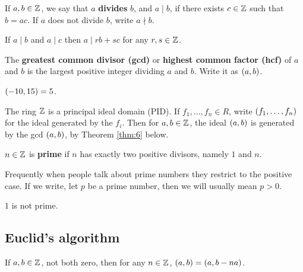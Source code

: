 \begin{definition}
If $ a, b \in \mathbb{Z} $, we say that $ a $ \textbf{divides} $ b $, and $ a \mid b $, if there exists $ c \in \mathbb{Z} $ such that $ b = ac $. If $ a $ does not divide $ b $, write $ a \nmid b $.
\end{definition}

If $ a \mid b $ and $ a \mid c $ then $ a \mid rb + sc $ for any $ r, s \in \mathbb{Z} $.

\begin{definition}
The \textbf{greatest common divisor (gcd)} or \textbf{highest common factor (hcf)} of $ a $ and $ b $ is the largest positive integer dividing $ a $ and $ b $. Write it as $ \br{a, b} $.
\end{definition}

\begin{example*}
$ \br{-10, 15} = 5 $.
\end{example*}

\begin{note*}
The ring $ \mathbb{Z} $ is a principal ideal domain (PID). If $ f_1, \dots, f_n \in R $, write $ \br{f_1, \dots, f_n} $ for the ideal generated by the $ f_i $. Then for $ a, b \in \mathbb{Z} $, the ideal $ \br{a, b} $ is generated by the gcd $ \br{a, b} $, by Theorem \ref{thm:6} below.
\end{note*}

\begin{definition}
$ n \in \mathbb{Z} $ is \textbf{prime} if $ n $ has exactly two positive divisors, namely $ 1 $ and $ n $.
\end{definition}

\begin{note*}
Frequently when people talk about prime numbers they restrict to the positive case. If we write, let $ p $ be a prime number, then we will usually mean $ p > 0 $.
\end{note*}

\begin{note*}
$ 1 $ is not prime.
\end{note*}

\subsection{Euclid's algorithm}

\begin{proposition}
If $ a, b \in \mathbb{Z} $, not both zero, then for any $ n \in \mathbb{Z} $, $ \br{a, b} = \br{a, b - na} $.
\end{proposition}

